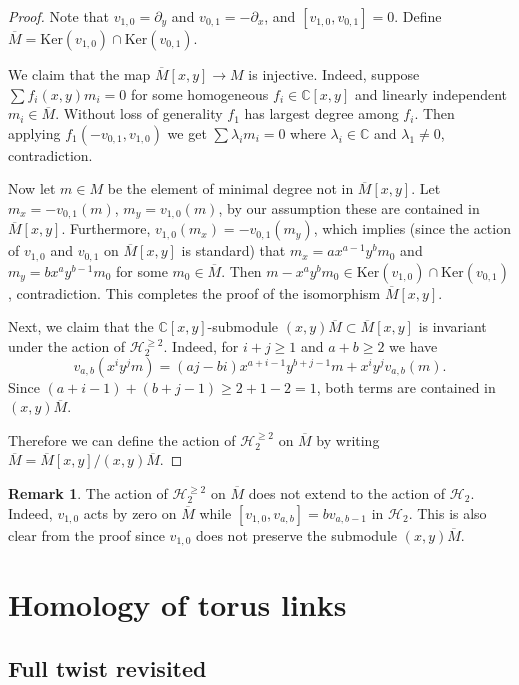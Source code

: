\documentclass{amsart}
\newcommand{\C}{\mathbb{C}}
\newcommand{\Ker}{\mathrm{Ker}}
\numberwithin{equation}{section}
\theoremstyle{definition}
\newtheorem{remark}[theorem]{Remark}
\begin{document}
\begin{proof}
Note that $v_{1,0}=\partial_y$ and $v_{0,1}=-\partial_x$, and $[v_{1,0},v_{0,1}]=0$. Define $\overline{M}=\Ker(v_{1,0})\cap \Ker(v_{0,1})$.

We claim that the map $\overline{M}[x,y]\to M$ is injective. Indeed, suppose $\sum f_i(x,y)m_i=0$ for some homogeneous $f_i\in \C[x,y]$ and linearly independent $m_i\in \overline{M}$. Without loss of generality $f_1$ has largest degree among $f_i$. Then applying $f_1(-v_{0,1},v_{1,0})$ we get $\sum \lambda_im_i=0$ where $\lambda_i\in \C$ and $\lambda_1\neq 0$, contradiction.

Now let $m\in M$ be the element of minimal degree not in $\overline{M}[x,y]$. Let $m_x=-v_{0,1}(m)$, $m_y=v_{1,0}(m)$, by our assumption these are contained in $\overline{M}[x,y]$. Furthermore, $v_{1,0}(m_x)=-v_{0,1}(m_y)$, which implies (since the action of $v_{1,0}$ and $v_{0,1}$ on $\overline{M}[x,y]$ is standard)  that $m_x=ax^{a-1}y^bm_0$ and $m_y=bx^ay^{b-1}m_0$ for some $m_0\in \overline{M}$. Then $m-x^ay^bm_0\in \Ker(v_{1,0})\cap \Ker(v_{0,1})$, contradiction.
This completes the proof of the isomorphism $\overline{M}[x,y]$.

Next, we claim that the $\C[x,y]$-submodule $(x,y)\overline{M}\subset \overline{M}[x,y]$ is invariant under the action of $\mathcal{H}_2^{\ge 2}$. Indeed, for $i+j\ge 1$ and $a+b\ge 2$ we have
$$
v_{a,b}(x^iy^jm)=(aj-bi)x^{a+i-1}y^{b+j-1}m+x^iy^jv_{a,b}(m).
$$
Since $(a+i-1)+(b+j-1)\ge 2+1-2=1$, both terms are contained in $(x,y)\overline{M}$. 

Therefore we can define the action of $\mathcal{H}_2^{\ge 2}$ on $\overline{M}$ by writing $\overline{M}=\overline{M}[x,y]/(x,y)\overline{M}$.
\end{proof}

\begin{remark}
The action of $\mathcal{H}_2^{\ge 2}$ on $\overline{M}$ does not extend to the action of $\mathcal{H}_2$. Indeed, $v_{1,0}$ acts by zero on $\overline{M}$ while $[v_{1,0},v_{a,b}]=bv_{a,b-1}$ in $\mathcal{H}_2$.
This is also clear from the proof since $v_{1,0}$ does not preserve the submodule  $(x,y)\overline{M}$.
\end{remark}

\section{Homology of torus links}
\label{sec:links}

\subsection{Full twist revisited}
\end{document}
